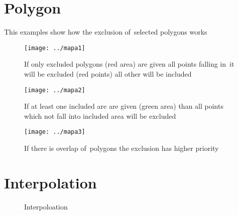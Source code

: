 \appendix
 \chapter{Polygon}
  This examples show how the exclusion of~selected polygons works
  \begin{figure}[htb]
    \texttt{[image: ../mapa1]}
    \caption{If only excluded polygons (red area) are given 
    all points falling in~it will be excluded (red points) all other
    will be included}
  \end{figure}
  \begin{figure}
    \texttt{[image: ../mapa2]}
    \caption{If at least one included are are given
    (green area) than all points which not fall into included area will
    be excluded}
  \end{figure}
  \begin{figure}
    \texttt{[image: ../mapa3]}
    \caption{If there is overlap of~polygons the exclusion has higher
    priority}
  \end{figure}
  \chapter{Interpolation}
  \begin{figure}
  
  \caption{Interpoloation}
  \end{figure}
  
  

\newpage 

\printindex


